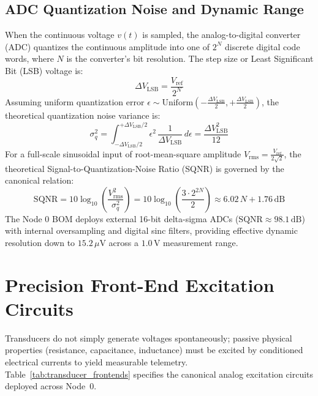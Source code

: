 \subsection{ADC Quantization Noise and Dynamic Range}
When the continuous voltage $v(t)$ is sampled, the analog-to-digital converter (ADC) quantizes the continuous amplitude into one of $2^N$ discrete digital code words, where $N$ is the converter's bit resolution. The step size or Least Significant Bit (LSB) voltage is:
\begin{equation}
\Delta V_{\mathrm{LSB}} = \frac{V_{\mathrm{ref}}}{2^N}
\label{eq:lsb_voltage}
\end{equation}
Assuming uniform quantization error $\epsilon \sim \mathrm{Uniform}\left(-\frac{\Delta V_{\mathrm{LSB}}}{2}, +\frac{\Delta V_{\mathrm{LSB}}}{2}\right)$, the theoretical quantization noise variance is:
\begin{equation}
\sigma_q^2 = \int_{-\Delta V_{\mathrm{LSB}}/2}^{+\Delta V_{\mathrm{LSB}}/2} \epsilon^2 \, \frac{1}{\Delta V_{\mathrm{LSB}}} \, d\epsilon = \frac{\Delta V_{\mathrm{LSB}}^2}{12}
\label{eq:quantization_variance}
\end{equation}
For a full-scale sinusoidal input of root-mean-square amplitude $V_{\mathrm{rms}} = \frac{V_{\mathrm{ref}}}{2\sqrt{2}}$, the theoretical Signal-to-Quantization-Noise Ratio (SQNR) is governed by the canonical relation:
\begin{equation}
\mathrm{SQNR} = 10 \log_{10} \left( \frac{V_{\mathrm{rms}}^2}{\sigma_q^2} \right) = 10 \log_{10} \left( \frac{3 \cdot 2^{2N}}{2} \right) \approx 6.02 \, N + 1.76\,\mathrm{dB}
\label{eq:sqnr_derivation}
\end{equation}
The Node 0 BOM deploys external 16-bit delta-sigma ADCs ($\mathrm{SQNR} \approx 98.1\,\mathrm{dB}$) with internal oversampling and digital sinc filters, providing effective dynamic resolution down to $15.2\,\mu\mathrm{V}$ across a $1.0\,\mathrm{V}$ measurement range.

\section{Precision Front-End Excitation Circuits}
\label{sec:frontend_circuits}

Transducers do not simply generate voltages spontaneously; passive physical properties (resistance, capacitance, inductance) must be excited by conditioned electrical currents to yield measurable telemetry. Table~\ref{tab:transducer_frontends} specifies the canonical analog excitation circuits deployed across Node~0.

